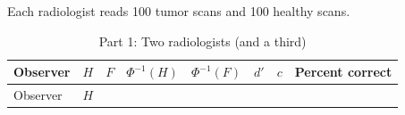 Each radiologist reads 100 tumor scans and 100 healthy scans.

\begin{landscape}\small
\begin{longtable}[]{@{}
  >{\raggedright\arraybackslash}p{}
  >{\raggedright\arraybackslash}p{}
  >{\raggedright\arraybackslash}p{}
  >{\raggedright\arraybackslash}p{}
  >{\raggedright\arraybackslash}p{}
  >{\raggedright\arraybackslash}p{}
  >{\raggedright\arraybackslash}p{}
  >{\raggedright\arraybackslash}p{}@{}}
\caption{\centering Part 1: Two radiologists (and a third)}\tabularnewline
\toprule\noalign{}
\begin{minipage}[b]{\linewidth}\raggedright
Observer
\end{minipage} & \begin{minipage}[b]{\linewidth}\raggedright
\(H\)
\end{minipage} & \begin{minipage}[b]{\linewidth}\raggedright
\(F\)
\end{minipage} & \begin{minipage}[b]{\linewidth}\raggedright
\(\Phi^{-1}(H)\)
\end{minipage} & \begin{minipage}[b]{\linewidth}\raggedright
\(\Phi^{-1}(F)\)
\end{minipage} & \begin{minipage}[b]{\linewidth}\raggedright
\(d'\)
\end{minipage} & \begin{minipage}[b]{\linewidth}\raggedright
\(c\)
\end{minipage} & \begin{minipage}[b]{\linewidth}\raggedright
Percent correct
\end{minipage} \\
\midrule\noalign{}
\endfirsthead
\toprule\noalign{}
\begin{minipage}[b]{\linewidth}\raggedright
Observer
\end{minipage} & \begin{minipage}[b]{\linewidth}\raggedright
\(H\)
\end{minipage} & \begin{minipage}[b]{\linewidth}\raggedright

\end{minipage}
\end{longtable}
\end{landscape}

